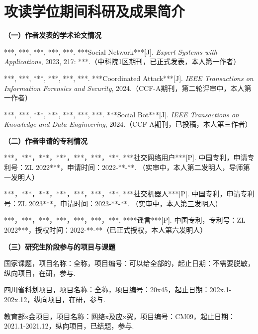 
\chapter{攻读学位期间科研及成果简介}  %

\noindent\textbf{（一）作者发表的学术论文情况}
\vspace{0.25em}

\noindent[1] ***, ***, ***, ***, ***. ***Social Network***[J]. \textit{Expert Systems with Applications}, 2023, 217: ***.（中科院1区期刊，已正式发表，本人第一作者）

\noindent[2] ***, ***, ***, ***, ***, ***. ***Coordinated Attack***[J]. \textit{IEEE Transactions on Information Forensics and Security}, 2024.（CCF-A期刊，第二轮评审中，本人第一作者）

\noindent[3] ***, ***, ***, ***, ***, ***, ***. ***Social Bot***[J]. \textit{IEEE Transactions on Knowledge and Data Engineering}, 2024.（CCF-A期刊，已投稿，本人第三作者）

\vspace{1em}

\noindent\textbf{（二）作者申请的专利情况}
\vspace{0.25em}

\noindent[1] ***，***，***，***，***，***，***. ***社交网络用户***[P]. 中国专利，申请专利号：ZL 2022***，申请时间：2022-**-**. （实审中，本人第二发明人，导师第一发明人）

\noindent[2] ***，***，***，***，***，***，***. ***社交机器人***[P]. 中国专利，申请专利号：ZL 2023***，申请时间：2023-**-**. （实审中，本人第三发明人）

\noindent[3] ***，***，***，***，***，***，***. ****谣言***[P]. 中国专利，专利号：ZL 2022***，授权时间：2022-**-**（已正式授权，本人第六发明人）

\vspace{1em}

\noindent\textbf{（三）研究生阶段参与的项目与课题}
\vspace{0.25em}

\noindent[1] 国家课题，项目名称：全称，项目编号：可以给全部的，起止日期：不需要脱敏，纵向项目，在研，参与.


\noindent[2] 四川省科划项目，项目名称：全称，项目编号：20x45，起止日期：202x.1-202x.12，纵向项目，在研，参与.


\noindent[3] 教育部x金项目，项目名称：网络x及应x究，项目编号：CM09，起止日期：2021.1-2021.12，纵向项目，已结题，参与.



